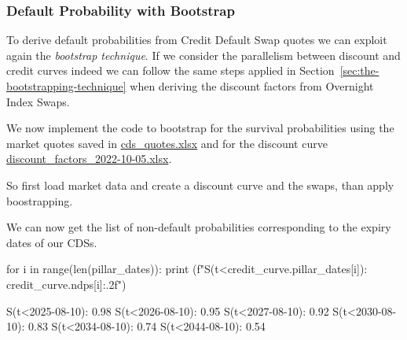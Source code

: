 \subsubsection*{Default Probability with Bootstrap}
\label{default-probabilities-and-cds}

To derive default probabilities from Credit Default Swap quotes we can exploit again the \emph{bootstrap technique}. 
If we consider the parallelism between discount and credit curves indeed we can follow the same steps applied in Section~\ref{sec:the-bootstrapping-technique} when deriving the discount factors from Overnight Index Swaps.


We now implement the code to bootstrap for the survival probabilities using the market quotes saved in 
\href{https://github.com/matteosan1/finance_course/raw/master/input_files/cds_quotes.xlsx}{cds\_quotes.xlsx} and for the discount curve 
\href{https://github.com/matteosan1/finance_course/raw/master/input_files/discount_factors_2022-10-05.xlsx}{discount\_factors\_2022-10-05.xlsx}.

So first load market data and create a discount curve and the swaps, than apply boostrapping.


We can now get the list of non-default probabilities corresponding to the expiry dates of our CDSs.

\begin{ipythonnon}
for i in range(len(pillar_dates)):
    print (f"S(t<{credit_curve.pillar_dates[i]}): {credit_curve.ndps[i]:.2f}")
\end{ipythonnon}
\begin{ioutput}
S(t<2025-08-10): 0.98
S(t<2026-08-10): 0.95
S(t<2027-08-10): 0.92
S(t<2030-08-10): 0.83
S(t<2034-08-10): 0.74
S(t<2044-08-10): 0.54
\end{ioutput}

%
